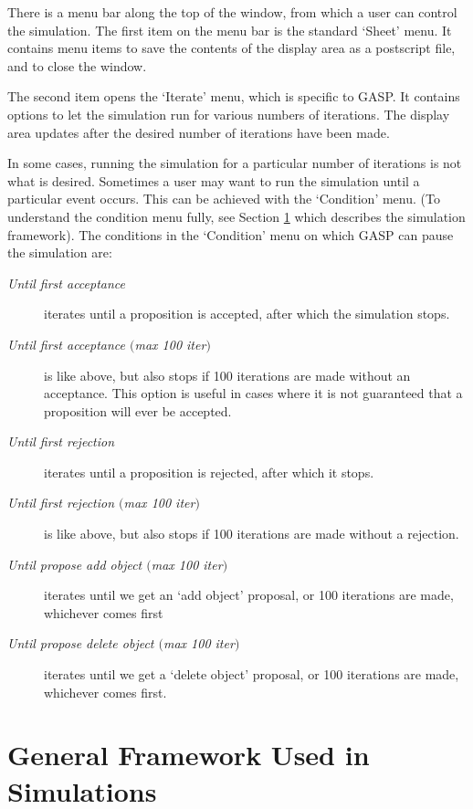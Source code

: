 There is a menu bar along the top of the window, from which a user
can control the simulation.  The first item on the menu bar is the
standard \XGAP{} `Sheet' menu.  It contains menu items to save the
contents of the display area as a postscript file, and to close the
window.

The second item opens the `Iterate' menu, which is specific to GASP.
It contains options to let the simulation run for various numbers of
iterations.  The display area updates after the desired number of
iterations have been made.

In some cases, running the simulation for a particular number of
iterations is not what is desired.  Sometimes a user may want to run
the simulation until a particular event occurs.  This can be achieved
with the `Condition' menu.  (To understand the condition menu fully,
see Section \ref{sect:sim-framework} which describes the simulation
framework).  The conditions in the `Condition' menu on which GASP can
pause the simulation are:

\begin{description}
\item[\emph{Until first acceptance}] iterates until a proposition is
accepted, after which the simulation stops.
\item[\emph{Until first acceptance $($max 100 iter$)$}] is like above,
but also stops if 100 iterations are made without an acceptance.  This
option is useful in cases where it is not guaranteed that a
proposition will ever be accepted.
\item[\emph{Until first rejection}] iterates until a proposition is rejected,
after which it stops.
\item[\emph{Until first rejection $($max 100 iter$)$}] is like above,
but also stops if 100 iterations are made without a rejection.
\item[\emph{Until propose add object $($max 100 iter$)$}] iterates
until we get an `add object' proposal, or 100 iterations are made,
whichever comes first
\item[\emph{Until propose delete object $($max 100 iter$)$}] iterates
until we get a `de\-lete object' proposal, or 100 iterations are made,
whichever comes first.
\end{description}


\section{General Framework Used in Simulations}\label{sect:sim-framework}

